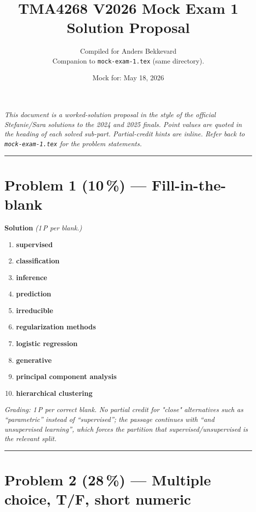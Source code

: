 \documentclass[11pt,a4paper]{article}
\title{TMA4268 V2026 Mock Exam 1\\[0.3em]
\large Solution Proposal}
\author{Compiled for Anders Bekkevard\\[0.2em]
\small Companion to \texttt{mock-exam-1.tex} (same directory).}
\date{Mock for: May 18, 2026}
\newcommand{\points}[1]{\textbf{(#1\,\%)}}
\newcommand{\sol}{\noindent\textbf{Solution}}
\begin{document}
\maketitle

\noindent\textit{This document is a worked-solution proposal in the style of the official Stefanie/Sara solutions
to the 2024 and 2025 finals. Point values are quoted in the heading of each solved sub-part. Partial-credit
hints are inline. Refer back to \texttt{mock-exam-1.tex} for the problem statements.}

\vspace{0.6em}
\hrule
\vspace{1em}

\section*{Problem 1 \points{10} --- Fill-in-the-blank}

\sol{} \emph{(1\,P per blank.)}

\begin{enumerate}[(1)]
  \item \textbf{supervised}
  \item \textbf{classification}
  \item \textbf{inference}
  \item \textbf{prediction}
  \item \textbf{irreducible}
  \item \textbf{regularization methods}
  \item \textbf{logistic regression}
  \item \textbf{generative}
  \item \textbf{principal component analysis}
  \item \textbf{hierarchical clustering}
\end{enumerate}

\noindent\emph{Grading: 1\,P per correct blank. No partial credit for "close" alternatives such as
``parametric'' instead of ``supervised''; the passage continues with ``and unsupervised learning'',
which forces the partition that supervised/unsupervised is the relevant split.}

\vspace{0.6em}
\hrule
\vspace{1em}

\section*{Problem 2 \points{28} --- Multiple choice, T/F, short numeric}
\end{document}
